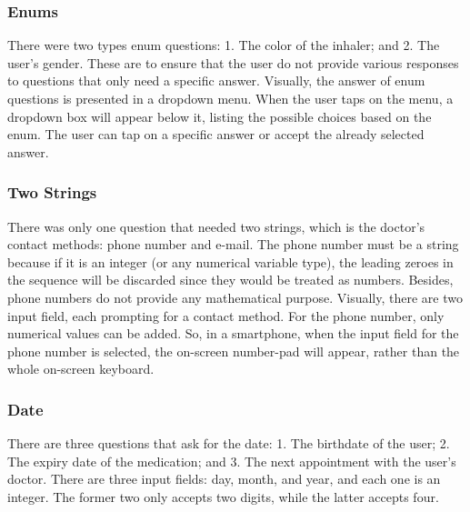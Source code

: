 \subsubsection{Enums}
There were two types enum questions: 1. The color of the inhaler; and 2. The user’s gender. These are to ensure that the user do not provide various responses to questions that only need a specific answer. Visually, the answer of enum questions is presented in a dropdown menu. When the user taps on the menu, a dropdown box will appear below it, listing the possible choices based on the enum. The user can tap on a specific answer or accept the already selected answer.

\subsubsection{Two Strings}
There was only one question that needed two strings, which is the doctor’s contact methods: phone number and e-mail. The phone number must be a string because if it is an integer (or any numerical variable type), the leading zeroes in the sequence will be discarded since they would be treated as numbers. Besides, phone numbers do not provide any mathematical purpose. Visually, there are two input field, each prompting for a contact method. For the phone number, only numerical values can be added. So, in a smartphone, when the input field for the phone number is selected, the on-screen number-pad will appear, rather than the whole on-screen keyboard.

\subsubsection{Date}
There are three questions that ask for the date: 1. The birthdate of the user; 2. The expiry date of the medication; and 3. The next appointment with the user’s doctor. There are three input fields: day, month, and year, and each one is an integer. The former two only accepts two digits, while the latter accepts four.

